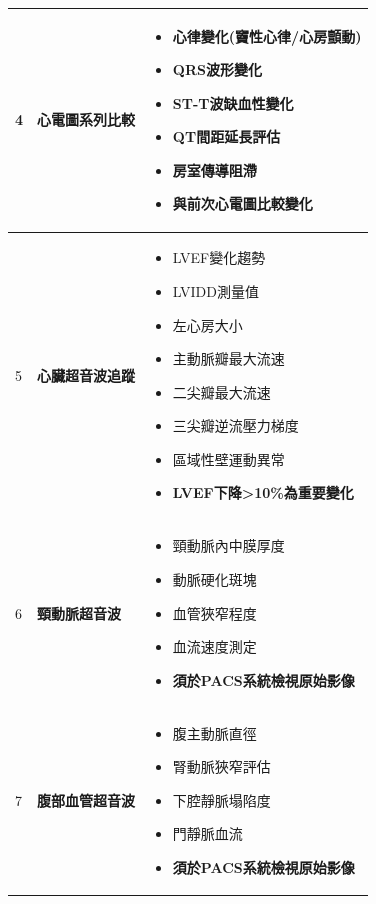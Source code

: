 \documentclass[12pt,a4paper]{article}
\begin{document}
\begin{longtable}{|p{1cm}|p{4.5cm}|p{8.5cm}|}
4 & \textbf{心電圖系列比較} & 
\begin{itemize}[nosep,leftmargin=*]
    \item 心律變化(竇性心律/心房顫動)
    \item QRS波形變化
    \item ST-T波缺血性變化
    \item QT間距延長評估
    \item 房室傳導阻滯
    \item \textbf{與前次心電圖比較變化}
\end{itemize} \\
\hline

5 & \textbf{心臟超音波追蹤} & 
\begin{itemize}[nosep,leftmargin=*]
    \item LVEF變化趨勢
    \item LVIDD測量值
    \item 左心房大小
    \item 主動脈瓣最大流速
    \item 二尖瓣最大流速
    \item 三尖瓣逆流壓力梯度
    \item 區域性壁運動異常
    \item \textbf{LVEF下降>10\%為重要變化}
\end{itemize} \\
\hline

6 & \textbf{頸動脈超音波} & 
\begin{itemize}[nosep,leftmargin=*]
    \item 頸動脈內中膜厚度
    \item 動脈硬化斑塊
    \item 血管狹窄程度
    \item 血流速度測定
    \item \textbf{須於PACS系統檢視原始影像}
\end{itemize} \\
\hline

7 & \textbf{腹部血管超音波} & 
\begin{itemize}[nosep,leftmargin=*]
    \item 腹主動脈直徑
    \item 腎動脈狹窄評估
    \item 下腔靜脈塌陷度
    \item 門靜脈血流
    \item \textbf{須於PACS系統檢視原始影像}
\end{itemize} \\
\hline


\end{longtable}
\end{document}
